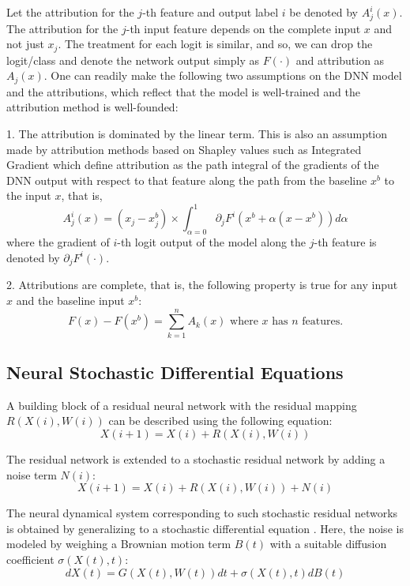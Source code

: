 \documentclass[10pt,twocolumn]{article}
\begin{document}
Let the attribution for the $j$-th feature and output label $i$ be denoted by $A^i_j(x)$. The attribution for the $j$-th input feature depends on the complete input $x$ and not just $x_j$. The treatment for each logit is similar, and so, we can drop the logit/class and denote the network output simply as $F(\cdot)$ and attribution as $A_j(x)$. One can readily make the following two assumptions on the DNN model and the attributions, which reflect that the model is well-trained and the attribution method is well-founded:

1. The attribution is dominated by the linear term. This is also an assumption made by attribution methods based on Shapley values such as Integrated Gradient \cite{adebayo2018sanity} which define attribution as the path integral of the gradients of the DNN output with respect to that feature along the path from the baseline $x^b$ to the input $x$, that is,
\begin{equation}
A^i_j(x) = (x_j - x^b_j) \times \int^1_{\alpha=0} \partial_j F^i(x^b + \alpha(x - x^b))d\alpha
\end{equation}
where the gradient of $i$-th logit output of the model along the $j$-th feature is denoted by $\partial_j F^i(\cdot)$.

2. Attributions are complete, that is, the following property is true for any input $x$ and the baseline input $x^b$:
\begin{equation}
F(x) - F(x^b) = \sum^n_{k=1} A_k(x) \text{ where } x \text{ has } n \text{ features.}
\end{equation}

\subsection{Neural Stochastic Differential Equations}

A building block of a residual neural network \cite{adebayo2018sanity} with the residual mapping $R(X(i), W(i))$ can be described using the following equation:
\begin{equation}
X(i + 1) = X(i) + R(X(i), W(i))
\end{equation}

The residual network is extended to a stochastic residual network by adding a noise term $N(i)$:
\begin{equation}
X(i + 1) = X(i) + R(X(i), W(i)) + N(i)
\end{equation}

The neural dynamical system corresponding to such stochastic residual networks is obtained by generalizing to a stochastic differential equation \cite{adebayo2018sanity}. Here, the noise is modeled by weighing a Brownian motion term $B(t)$ with a suitable diffusion coefficient $\sigma(X(t), t)$:
\begin{equation}
dX(t) = G(X(t), W(t)) dt + \sigma(X(t), t) dB(t)
\end{equation}
\end{document}
